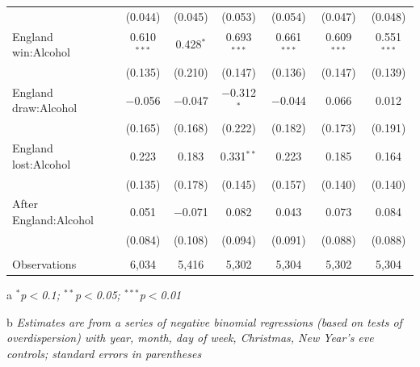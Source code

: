 \documentclass[12pt, letterpaper]{article}
\begin{document}
\begin{table}
{\begin{threeparttable}
\begin{tabular}{@{\extracolsep{5pt}}lcccccc}
  & (0.044) & (0.045) & (0.053) & (0.054) & (0.047) & (0.048) \\ 
  England win:Alcohol & 0.610$^{***}$ & 0.428$^{*}$ & 0.693$^{***}$ & 0.661$^{***}$ & 0.609$^{***}$ & 0.551$^{***}$ \\ 
  & (0.135) & (0.210) & (0.147) & (0.136) & (0.147) & (0.139) \\ 
  England draw:Alcohol & $-$0.056 & $-$0.047 & $-$0.312$^{*}$ & $-$0.044 & 0.066 & 0.012 \\ 
  & (0.165) & (0.168) & (0.222) & (0.182) & (0.173) & (0.191) \\ 
  England lost:Alcohol & 0.223 & 0.183 & 0.331$^{**}$ & 0.223 & 0.185 & 0.164 \\ 
  & (0.135) & (0.178) & (0.145) & (0.157) & (0.140) & (0.140) \\ 
  After England:Alcohol & 0.051 & $-$0.071 & 0.082 & 0.043 & 0.073 & 0.084 \\ 
  & (0.084) & (0.108) & (0.094) & (0.091) & (0.088) & (0.088) \\ 
 \hline \\[-1.8ex] 
Observations & 6,034 & 5,416 & 5,302 & 5,304 & 5,302 & 5,304 \\ 
\hline 

\end{tabular} 
\begin{tablenotes}
      \item[a] \textit{$^{*}$p$<$0.1; $^{**}$p$<$0.05; $^{***}$p$<$0.01}
      \item[b] \textit{Estimates are from a series of negative binomial regressions (based on tests of overdispersion)  with year, month, day of week, Christmas, New Year's eve controls; standard errors in parentheses}
    \end{tablenotes}
\end{threeparttable} } 
\end{table}
\end{document}
